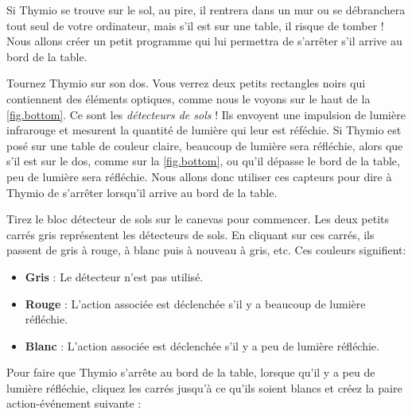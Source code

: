 
Si Thymio se trouve sur le sol, au pire, il rentrera dans un mur ou se débranchera tout seul de votre ordinateur, mais s'il est sur une table, il risque de tomber !
Nous allons créer un petit programme qui lui permettra de s'arrêter s'il arrive au bord de la table.


Tournez Thymio sur son dos. Vous verrez deux petits rectangles noirs qui contiennent des éléments optiques, comme nous le voyons sur le haut de la \cref{fig.bottom}.
Ce sont les \emph{détecteurs de sols} !
Ils envoyent une impulsion de lumière infrarouge et mesurent la quantité de lumière qui leur est réféchie.
Si Thymio est posé sur une table de couleur claire, beaucoup de lumière sera réfléchie, alors que s'il est sur le dos, comme sur la \cref{fig.bottom}, ou qu'il dépasse le bord de la table, peu de lumière sera réfléchie.
Nous allons donc utiliser ces capteurs pour dire à Thymio de s'arrêter lorsqu'il arrive au bord de la table.


Tirez le bloc détecteur de sols  sur le canevas pour commencer.
Les deux petits carrés gris représentent les détecteurs de sols.
En cliquant sur ces carrés, ils passent de gris à rouge, à blanc puis à nouveau à gris, etc. Ces couleurs signifient:

\begin{itemize}
\item \textbf{Gris} : Le détecteur n'est pas utilisé.
\item \textbf{Rouge} : L'action associée est déclenchée s'il y a beaucoup de lumière réfléchie.
\item \textbf{Blanc} : L'action associée est déclenchée s'il y a peu de lumière réfléchie.
\end{itemize}

Pour faire que Thymio s'arrête au bord de la table, lorsque qu'il y a peu de lumière réfléchie, cliquez les carrés jusqu'à ce qu'ils soient blancs et créez la paire action-événement suivante : 


